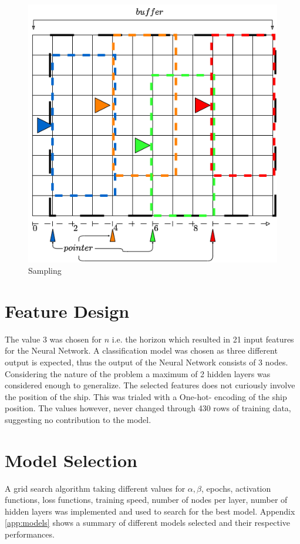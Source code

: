 \documentclass[10pt,journal,compsoc]{IEEEtran}
\begin{document}
\begin{figure}
    \centering
    \includegraphics[width=\linewidth]{sampling.png}
    \caption{Sampling}
    \label{fig:sampling}
\end{figure}

\section{Feature Design}

The value 3 was chosen for $n$ i.e. the horizon which resulted in 21 input features for the Neural Network. 
A classification model was chosen as three different output is expected, thus the output of the Neural 
Network consists of 3 nodes.
Considering the nature of the problem a maximum of 2 hidden layers was considered enough to generalize. 
The selected features does not curiously involve the position of the ship. This was trialed with a One-hot-
encoding of the ship position. The values however, never changed through 430 rows of training data, 
suggesting no contribution to the model. 

\section{Model Selection}
A grid search algorithm taking different values for $\alpha, \beta$, epochs, activation functions, loss 
functions, training speed, number of nodes per layer, number of hidden layers was implemented and used
to search for the best model. Appendix \ref{app:models} shows a summary of different models selected and their 
respective performances. 
\end{document}
